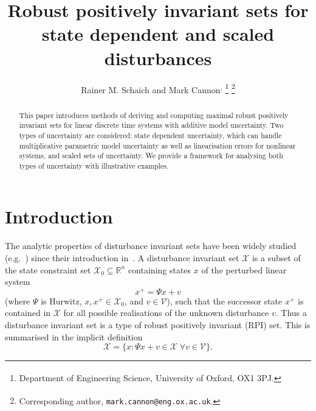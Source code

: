 \documentclass[letterpaper, 10pt, conference]{ieeeconf} %
\begin{document}
  \title{Robust positively invariant sets for state dependent and scaled disturbances}

\author{Rainer M. Schaich\textsuperscript{\dag} %
         and Mark Cannon\textsuperscript{\dag,\ddag}%
\thanks{\textsuperscript{\dag} Department of Engineering Science, University of Oxford, OX1 3PJ.}%
\thanks{\textsuperscript{\ddag} Corresponding author, 
        \texttt{mark.cannon@eng.ox.ac.uk}.}
}
\newcommand{\note}[1]{\todo[inline]{#1}}

\maketitle

\begin{abstract} 
  This paper introduces methods of deriving and computing maximal robust positively invariant sets 
  for linear discrete time systems with additive model uncertainty. Two types of uncertainty are 
  considered: state dependent uncertainty, which can handle multiplicative parametric model uncertainty 
  as well as linearisation errors for nonlinear systems, and scaled
  sets of uncertainty. We provide 
  a framework for analysing both types of uncertainty with illustrative examples.
\end{abstract}

\begin{keywords}
\vskip-\baselineskip
\end{keywords}

\section{Introduction}
The analytic properties of disturbance invariant sets have been widely
studied (e.g.~\cite{blanchini:2007}) 
since their introduction in~\cite{Glover:1971,bertsekas71}. A disturbance invariant set $\mathscr X$ is a subset of the 
state constraint set $\mathcal X_0\subseteq\mathbb R^n$ containing
states $x$ of the perturbed linear system
\begin{equation}\label{eq:system:equation}
	x^+ = \Psi x + v
\end{equation}
(where $\Psi$ is Hurwitz, $x,x^+\in\mathcal X_0$, and 
$v\in\mathscr V$), such that the successor state $x^+$ is contained in $\mathscr X$
for all possible realisations of the 
unknown disturbance $v$. Thus a disturbance invariant set is a type of robust positively invariant (RPI) set. 
This is summarised in the implicit definition
\begin{equation}\label{eq:definition:MRPI:set:state:dependent}
	\mathscr X = \{x:\Psi x + v\in\mathscr X\; \forall v\in\mathscr V\}.
\end{equation}
\end{document}
